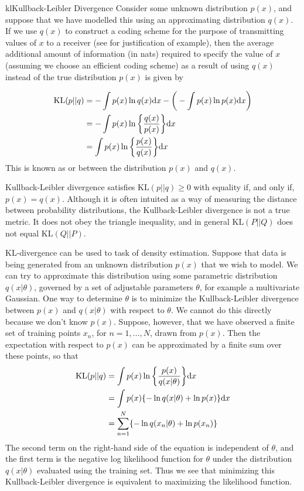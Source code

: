 \documentclass[9pt]{article}
\begin{document}
\begin{topic}{kl}{Kullback-Leibler Divergence}
Consider some unknown distribution $p(x)$, and suppose that we have modelled this using an approximating distribution $q(x)$. If we use $q(x)$ to construct a coding scheme for the purpose of transmitting values of $x$ to a receiver (see  for justification of example), then the average additional amount of information (in nats) required to specify the value of $x$ (assuming we choose an efficient coding scheme) as a result of using $q(x)$ instead of the true distribution $p(x)$ is given by

\[
\begin{split}
\text{KL}(p||q) & = - \int p(x) \ln q(x) \mathrm{d} x - \bigg(- \int p(x) \ln p(x) \mathrm{d} x\bigg)\\
& = -\int p(x) \ln \bigg\{\frac{q(x)}{p(x)}\bigg\} \mathrm{d} x\\
& = \int p(x) \ln \bigg\{\frac{p(x)}{q(x)}\bigg\} \mathrm{d} x
\end{split}
\]
This is known as \textit{\color{red}{Kullback-Leibler divergence}} or \textit{\color{red}{relative entropy}} between the distribution $p(x)$ and $q(x)$.

Kullback-Leibler divergence satisfies $\text{KL}(p||q) \ge 0$ with equality if, and only if, $p(x) = q(x)$. Although it is often intuited as a way of measuring the distance between probability distributions, the Kullback-Leibler divergence is not a true metric. It does not obey the triangle inequality, and in general $\text{KL}(P||Q)$ does not equal $\text{KL}(Q||P)$.

KL-divergence can be used to task of density estimation. Suppose that data is being generated from an unknown distribution $p(x)$ that we wish to model. We can try to approximate this distribution using some parametric distribution $q(x|\theta)$, governed by a set of adjustable parameters $\theta$, for example a multivariate Gaussian. One way to determine $\theta$ is to minimize the Kullback-Leibler divergence between $p(x)$ and $q(x|\theta)$ with respect to $\theta$. We cannot do this directly because we don't know $p(x)$. Suppose, however, that we have observed a finite set of training points $x_n$, for $n = 1,\ldots,N$, drawn from $p(x)$. Then the expectation with respect to $p(x)$ can be approximated by a finite sum over these points, so that
\[
\begin{split}
\text{KL}(p||q) &= \int p(x) \ln \bigg\{\frac{p(x)}{q(x|\theta)}\bigg\}\mathrm{d} x\\
&= \int p(x) \{-\ln q(x|\theta) + \ln p(x)\}\mathrm{d} x\\
&= \sum_{n=1}^{N}\{-\ln q(x_n|\theta) + \ln p(x_n)\}\\
\end{split}
\]
The second term on the right-hand side of the equation is independent of $\theta$, and the first term is the negative log likelihood function for $\theta$ under the distribution $q(x|\theta)$ evaluated using the training set. Thus we see that minimizing this Kullback-Leibler divergence is equivalent to maximizing the likelihood function.


\end{topic}
\end{document}
